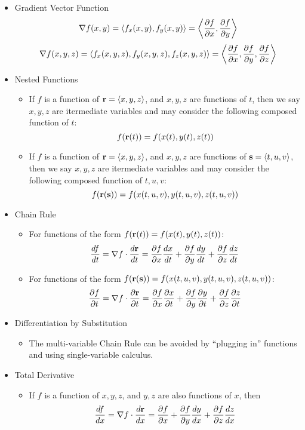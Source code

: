 \begin{itemize}

  \item Gradient Vector Function
    \[\nabla f(x,y) = \left< f_x(x,y),f_y(x,y) \right> = \left<\frac{\partial f}{\partial x}, \frac{\partial f}{\partial y}\right>\]
    \[\nabla f(x,y,z) = \left< f_x(x,y,z),f_y(x,y,z),f_z(x,y,z) \right> = \left<\frac{\partial f}{\partial x}, \frac{\partial f}{\partial y}, \frac{\partial f}{\partial z}\right>\]

  \item Nested Functions
    \begin{itemize}
      \item If $f$ is a function of $\mathbf{r}=\left<x,y,z\right>$, and $x,y,z$ are functions of $t$, then we say $x,y,z$ are itermediate variables and may consider the following composed function of $t$:
        \[f(\mathbf{r}(t))=f(x(t),y(t),z(t))\]
      \item If $f$ is a function of $\mathbf{r}=\left<x,y,z\right>$, and $x,y,z$ are functions of $\mathbf{s}=\left<t,u,v\right>$, then we say $x,y,z$ are itermediate variables and may consider the following composed function of $t,u,v$:
        \[f(\mathbf{r}(\mathbf{s}))=f(x(t,u,v),y(t,u,v),z(t,u,v))\]
    \end{itemize}
  
  \item Chain Rule
    \begin{itemize}
      \item For functions of the form $f(\mathbf{r}(t))=f(x(t),y(t),z(t))$:
        \[
          \frac{df}{dt}=\nabla{f}\cdot\frac{d\mathbf{r}}{dt}=\frac{\partial f}{\partial x}\frac{dx}{dt}+\frac{\partial f}{\partial y}\frac{dy}{dt}+\frac{\partial f}{\partial z}\frac{dz}{dt}
        \]
      \item For functions of the form $f(\mathbf{r}(\mathbf{s}))=f(x(t,u,v),y(t,u,v),z(t,u,v))$:
        \[
          \frac{\partial f}{\partial t}=\nabla{f}\cdot\frac{\partial\mathbf{r}}{\partial t}=\frac{\partial f}{\partial x}\frac{\partial x}{\partial t}+\frac{\partial f}{\partial y}\frac{\partial y}{\partial t}+\frac{\partial f}{\partial z}\frac{\partial z}{\partial t}
        \]
    \end{itemize}
    
  \item Differentiation by Substitution
  
    \begin{itemize}
    \item The multi-variable Chain Rule can be avoided by ``plugging in'' functions and using single-variable calculus.
    \end{itemize}

  \newpage

  \item Total Derivative
    \begin{itemize}
    \item If $f$ is a function of $x,y,z$, and $y,z$ are also functions of $x$, then
      \[
        \frac{df}{dx} = \nabla f \cdot \frac{d\mathbf{r}}{dx} = 
        \frac{\partial f}{\partial x} + \frac{\partial f}{\partial y}\frac{dy}{dx} + \frac{\partial f}{\partial z}\frac{dz}{dx} 
      \]
    \end{itemize}
    

\end{itemize}
